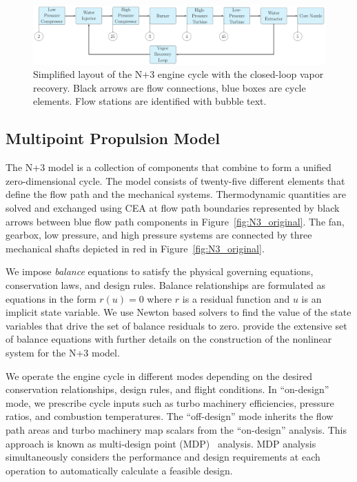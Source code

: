 \documentclass[conf]{new-aiaa}
\begin{document}
\begin{figure}[hbt!]
    \centering
    \includegraphics[width=1.0\textwidth]{N3_CLVR_cycle.pdf}
    \caption{
        Simplified layout of the N+3 engine cycle with the closed-loop vapor recovery.
        Black arrows are flow connections, blue boxes are cycle elements.
        Flow stations are identified with bubble text.
    }
    \label{fig:n3_clvr}
\end{figure}

\subsection{Multipoint Propulsion Model}
The N+3 model is a collection of components that combine to form a unified zero-dimensional cycle.
The model consists of twenty-five different elements that define the flow path and the mechanical systems.
Thermodynamic quantities are solved and exchanged using CEA at flow path boundaries represented by black arrows between blue flow path components in Figure~\ref{fig:N3_original}.
The fan, gearbox, low pressure, and high pressure systems are connected by three mechanical shafts depicted in red in Figure~\ref{fig:N3_original}.

We impose \emph{balance} equations to satisfy the physical governing equations, conservation laws, and design rules.
Balance relationships are formulated as equations in the form $r(u)=0$ where $r$ is a residual function and $u$ is an implicit state variable.
We use Newton based solvers to find the value of the state variables that drive the set of balance residuals to zero.
\citeauthor{Hendricks2019} provide the extensive set of balance equations with further details on the construction of the nonlinear system for the N+3 model.

We operate the engine cycle in different modes depending on the desired conservation relationships, design rules, and flight conditions.
In ``on-design'' mode, we prescribe cycle inputs such as turbo machinery efficiencies, pressure ratios, and combustion temperatures.
The ``off-design'' mode inherits the flow path areas and turbo machinery map scalars from the ``on-design'' analysis.
This approach is known as multi-design point (MDP)~\cite{Schutte2009} analysis.
MDP analysis simultaneously considers the performance and design requirements at each operation to automatically calculate a feasible design.
\end{document}
